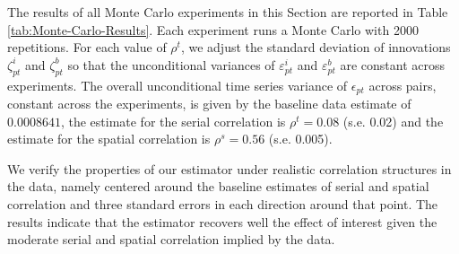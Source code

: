 \documentclass[12pt]{article}
\newcommand{\1}{\mathbf{1}}
\begin{document}
\begin{appendix}
The results of all Monte Carlo experiments in this Section are reported in Table \ref{tab:Monte-Carlo-Results}. Each experiment runs a Monte Carlo with 2000 repetitions. For each value of $\rho^{t}$, we adjust the standard deviation of innovations $\zeta_{pt}^{i}$ and $\zeta_{pt}^{b}$ so that the unconditional variances of $\varepsilon_{pt}^{i}$ and $\varepsilon_{pt}^{b}$ are constant across experiments. The overall unconditional time series variance of $\epsilon_{pt}$ across pairs, constant across the experiments, is given by the baseline data estimate of $0.0008641$, the estimate for the serial correlation is $\rho^{t}=0.08$ (s.e. 0.02) and the estimate for the spatial correlation is $\rho^{s}=0.56$ (s.e. 0.005).

We verify the properties of our estimator under realistic correlation structures in the data, namely centered around the baseline estimates of serial and spatial correlation and three standard errors in each direction around that point. The results indicate that the estimator recovers well the effect of interest given the moderate serial and spatial correlation implied by the data.



\end{appendix}
\end{document}
